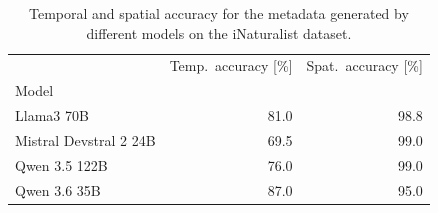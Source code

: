 \begin{table}[h]
\caption{Temporal and spatial accuracy for the metadata generated by different models on the iNaturalist dataset.}
\label{tab:results_inat}
\begin{tabular}{lrr}
\toprule
 & Temp.\ accuracy [\%] & Spat.\ accuracy [\%] \\
Model &  &  \\
\midrule
Llama3 70B & 81.0 & 98.8 \\
Mistral Devstral 2 24B & 69.5 & 99.0 \\
Qwen 3.5 122B & 76.0 & 99.0 \\
Qwen 3.6 35B & 87.0 & 95.0 \\
\bottomrule
\end{tabular}
\end{table}
